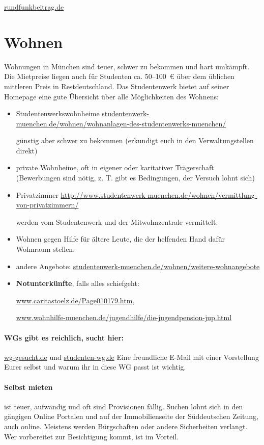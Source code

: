 \begin{urlList}
    \item \url{rundfunkbeitrag.de}
\end{urlList}

\section{Wohnen}
Wohnungen in München sind teuer, schwer zu bekommen und hart umkämpft. Die Mietpreise liegen
auch für Studenten ca. 50--100~€ über dem üblichen mittleren Preis in
Restdeutschland. Das Studentenwerk bietet auf seiner Homepage eine
gute Übersicht über alle Möglichkeiten des Wohnens:

\begin{itemize}
\item Studentenwerkswohnheime \newline \url{studentenwerk-muenchen.de/wohnen/wohnanlagen-des-studentenwerks-muenchen/}

  günstig aber schwer zu bekommen (erkundigt euch in den Verwaltungstellen direkt)
\item private Wohnheime, oft in eigener oder karitativer Trägerschaft
  (Bewerbungen sind nötig, z. T. gibt es Bedingungen, der Versuch lohnt sich)
\item
  Privatzimmer \newline \url{http://www.studentenwerk-muenchen.de/wohnen/vermittlung-von-privatzimmern/}
  
werden vom Studentenwerk und der Mitwohnzentrale vermittelt.
\item Wohnen gegen Hilfe für ältere Leute, die der helfenden Hand dafür
  Wohnraum stellen.
\item andere Angebote: \url{studentenwerk-muenchen.de/wohnen/weitere-wohnangebote}
\item {\bf Notunterkünfte}, falls alles schiefgeht:

 \url{www.caritastoelz.de/Page010179.htm},

  \url{www.wohnhilfe-muenchen.de/jugendhilfe/die-jugendpension-jup.html}
\end{itemize}

\paragraph{WGs gibt es reichlich, sucht hier:}
\url{wg-gesucht.de} und \url{studenten-wg.de}\newline
Eine freundliche E-Mail mit einer Vorstellung Eurer selbst und warum ihr
in diese WG passt ist wichtig.

\paragraph{Selbst mieten} ist teuer, aufwändig und oft sind Provisionen
fällig. Suchen
lohnt sich in den gängigen Online Portalen und auf der Immobilienseite der
Süddeutschen Zeitung, auch online. Meistens werden Bürgschaften oder andere
Sicherheiten verlangt.  Wer vorbereitet zur Besichtigung kommt, ist im Vorteil.
